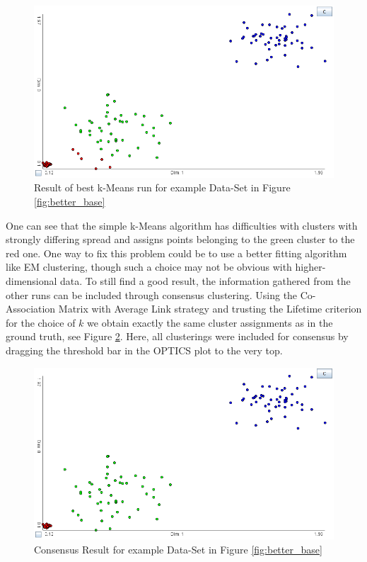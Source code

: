 \documentclass[
	a4paper,
	english,
	twoside,
	openright,               
	11pt                            
	]{report}
\begin{document}
\begin{figure}[h]
	\centering
	\includegraphics[scale=.5]{better_base_best}
	\caption{Result of best k-Means run for example Data-Set in Figure \ref{fig:better_base}}
	\label{fig:better_base_best}
\end{figure}

One can see that the simple k-Means algorithm has difficulties with clusters with strongly differing spread and assigns points belonging to the green cluster to the red one. One way to fix this problem could be to use a better fitting algorithm like EM clustering, though such a choice may not be obvious with higher-dimensional data. To still find a good result, the information gathered from the other runs can be included through consensus clustering. Using the Co-Association Matrix with Average Link strategy and trusting the Lifetime criterion for the choice of $k$ we obtain exactly the same cluster assignments as in the ground truth, see Figure \ref{fig:better_base_consensus}. Here, all clusterings were included for consensus by dragging the threshold bar in the OPTICS plot to the very top.

\begin{figure}[h]
	\centering
	\includegraphics[scale=.5]{better_base_consensus}
	\caption{Consensus Result for example Data-Set in Figure \ref{fig:better_base}}
	\label{fig:better_base_consensus}
\end{figure}
\end{document}
